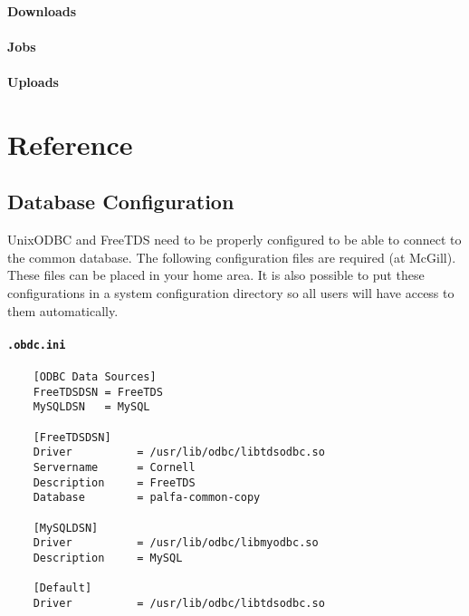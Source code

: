 \paragraph{Downloads}

\paragraph{Jobs}

\paragraph{Uploads}


\section{Reference}
\subsection{Database Configuration}
\label{sec:dbconf}
UnixODBC and FreeTDS need to be properly configured to be able to connect to the common database. The following configuration files are required (at McGill). These files can be placed in your home area. It is also possible to put these configurations in a system configuration directory so all users will have access to them automatically.

\paragraph{\texttt{.obdc.ini}}
\begin{verbatim}
    [ODBC Data Sources]
    FreeTDSDSN = FreeTDS
    MySQLDSN   = MySQL

    [FreeTDSDSN]
    Driver          = /usr/lib/odbc/libtdsodbc.so
    Servername      = Cornell
    Description     = FreeTDS
    Database        = palfa-common-copy

    [MySQLDSN]
    Driver          = /usr/lib/odbc/libmyodbc.so
    Description     = MySQL

    [Default]
    Driver          = /usr/lib/odbc/libtdsodbc.so
\end{verbatim}

